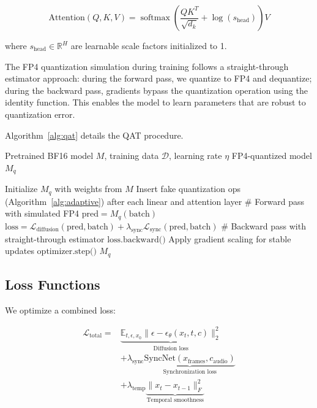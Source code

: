 \documentclass[journal,twoside]{IEEEtran}
\theoremstyle{definition}
\theoremstyle{remark}
\newcommand{\EE}{\mathbb{E}}
\newcommand{\RR}{\mathbb{R}}
\DeclareMathOperator{\softmax}{softmax}
\begin{document}
\begin{equation}
\text{Attention}(Q, K, V) = \softmax\left( \frac{Q K^T}{\sqrt{d_k}} + \log(s_{\text{head}}) \right) V
\end{equation}

where $s_{\text{head}} \in \RR^{H}$ are learnable scale factors initialized to 1.

The FP4 quantization simulation during training follows a straight-through estimator approach: during the forward pass, we quantize to FP4 and dequantize; during the backward pass, gradients bypass the quantization operation using the identity function. This enables the model to learn parameters that are robust to quantization error.

Algorithm~\ref{alg:qat} details the QAT procedure.

\begin{algorithm}[!htbp]
\footnotesize
\caption{Quantization-Aware Training for NVFP4-DiT}
\label{alg:qat}
\begin{algorithmic}[1]
\REQUIRE Pretrained BF16 model $M$, training data $\mathcal{D}$, learning rate $\eta$
\ENSURE FP4-quantized model $M_q$

\STATE Initialize $M_q$ with weights from $M$
\STATE Insert fake quantization ops (Algorithm~\ref{alg:adaptive}) after each linear and attention layer
        \STATE \# Forward pass with simulated FP4
        \STATE $\text{pred} = M_q(\text{batch})$
        \STATE $\text{loss} = \mathcal{L}_{\text{diffusion}}(\text{pred}, \text{batch}) + \lambda_{\text{sync}} \mathcal{L}_{\text{sync}}(\text{pred}, \text{batch})$
        \STATE \# Backward pass with straight-through estimator
        \STATE $\text{loss.backward()}$
            \STATE Apply gradient scaling for stable updates
        \ENDFOR
        \STATE $\text{optimizer.step()}$
    \ENDFOR
\ENDFOR
\RETURN $M_q$
\end{algorithmic}
\end{algorithm}

\subsection{Loss Functions}

We optimize a combined loss:

\begin{equation}
\begin{split}
\mathcal{L}_{\text{total}} = &\underbrace{\EE_{t, \epsilon, x_0} \| \epsilon - \epsilon_\theta(x_t, t, c) \|_2^2}_{\text{Diffusion loss}} \\
&+ \lambda_{\text{sync}} \underbrace{\text{SyncNet}(x_{\text{frames}}, c_{\text{audio}})}_{\text{Synchronization loss}} \\
&+ \lambda_{\text{temp}} \underbrace{\|x_{t} - x_{t-1}\|_F^2}_{\text{Temporal smoothness}}
\end{split}
\end{equation}
\end{document}
